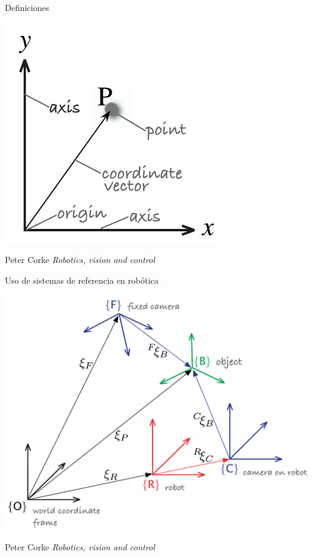 \documentclass[presentation,aspectratio=169]{beamer}
\begin{document}
\begin{frame}[label={sec:orga16ae4f}]{Definiciones}
\begin{center}
\includegraphics[height=0.5\textheight]{../figures/Corke-fig2.1.a.png}

\footnotesize Peter Corke \emph{Robotics, vision and control}
\end{center}
\end{frame}


\begin{frame}[label={sec:org0438fc8}]{Uso de sistemas de referencia en robótica}
\begin{center}
\includegraphics[height=0.5\textheight]{../figures/Corke-fig2.4.png}

\footnotesize Peter Corke \emph{Robotics, vision and control}
\end{center}
\end{frame}
\end{document}
